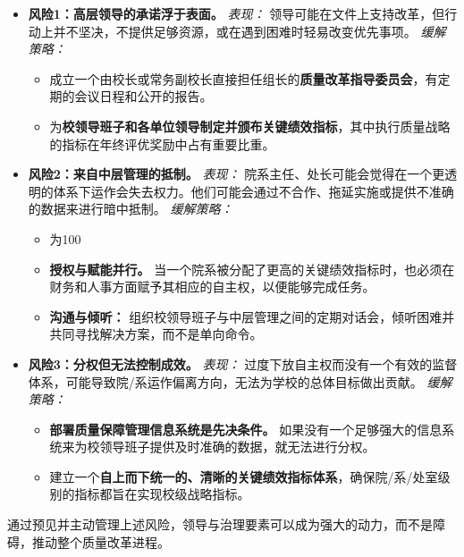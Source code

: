 \begin{itemize}
    \item \textbf{风险1：高层领导的承诺浮于表面。}
    \textit{表现：} 领导可能在文件上支持改革，但行动上并不坚决，不提供足够资源，或在遇到困难时轻易改变优先事项。
    \textit{缓解策略：}
    \begin{itemize}
        \item 成立一个由校长或常务副校长直接担任组长的\textbf{质量改革指导委员会}，有定期的会议日程和公开的报告。
        \item 为\textbf{校领导班子和各单位领导制定并颁布关键绩效指标}，其中执行质量战略的指标在年终评优奖励中占有重要比重。
    \end{itemize}

    \item \textbf{风险2：来自中层管理的抵制。}
    \textit{表现：} 院系主任、处长可能会觉得在一个更透明的体系下运作会失去权力。他们可能会通过不合作、拖延实施或提供不准确的数据来进行暗中抵制。
    \textit{缓解策略：}
    \begin{itemize}
        \item 为100%
        \item \textbf{授权与赋能并行。} 当一个院系被分配了更高的关键绩效指标时，也必须在财务和人事方面赋予其相应的自主权，以便能够完成任务。
        \item \textbf{沟通与倾听：} 组织校领导班子与中层管理之间的定期对话会，倾听困难并共同寻找解决方案，而不是单向命令。
    \end{itemize}

    \item \textbf{风险3：分权但无法控制成效。}
    \textit{表现：} 过度下放自主权而没有一个有效的监督体系，可能导致院/系运作偏离方向，无法为学校的总体目标做出贡献。
    \textit{缓解策略：}
    \begin{itemize}
        \item \textbf{部署质量保障管理信息系统是先决条件。} 如果没有一个足够强大的信息系统来为校领导班子提供及时准确的数据，就无法进行分权。
        \item 建立一个\textbf{自上而下统一的、清晰的关键绩效指标体系}，确保院/系/处室级别的指标都旨在实现校级战略指标。
    \end{itemize}
\end{itemize}

通过预见并主动管理上述风险，领导与治理要素可以成为强大的动力，而不是障碍，推动整个质量改革进程。





